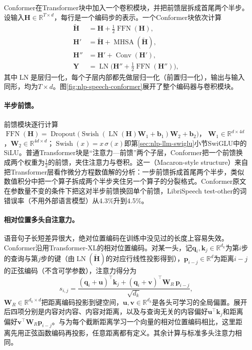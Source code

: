Conformer在Transformer块中加入一个卷积模块，并把前馈层拆成首尾两个半步。设输入$\bm H\in\mathbb R^{T\times d}$，每行是一个编码步的表示。一个Conformer块依次计算
\begin{equation}
 \begin{aligned}
  \tilde{\bm H}&=\bm H+\tfrac12\operatorname{FFN}(\bm H),\\
  \bm H'&=\tilde{\bm H}+\operatorname{MHSA}(\tilde{\bm H}),\\
  \bm H''&=\bm H'+\operatorname{Conv}(\bm H'),\\
  \bm Y&=\operatorname{LN}\bigl(\bm H''+\tfrac12\operatorname{FFN}(\bm H'')\bigr),
 \end{aligned}
 \label{eq:nlp-speech-conformer}
\end{equation}
其中$\operatorname{LN}$是层归一化，每个子层内部都先做层归一化（前置归一化），输出与输入同形，均为$T\times d$。图\ref{fig:nlp-speech-conformer}展开了整个编码器与卷积模块。

\paragraph{半步前馈。}前馈模块逐行计算
$\operatorname{FFN}(\bm H)=\operatorname{Dropout}\bigl(\operatorname{Swish}(\operatorname{LN}(\bm H)\bm W_1+\bm b_1)\bm W_2+\bm b_2\bigr)$，
$\bm W_1\in\mathbb R^{d\times4d}$，$\bm W_2\in\mathbb R^{4d\times d}$；$\operatorname{Swish}(x)=x\,\sigma(x)$即第\ref{sec:nlp-llm-swiglu}小节SwiGLU中的SiLU\cite{ramachandran2017swish}。普通Transformer块是“注意力—前馈”两个子层，Conformer把一个前馈换成两个权重为$\tfrac12$的前馈，夹住注意力与卷积。这一（Macaron-style structure）来自把Transformer层看作微分方程数值解的分析：一步前馈拆成首尾两个半步，类似数值积分中把一个算子拆成两个半步夹住另一个算子的分裂格式\cite{nlp-speech-lu2019macaron}。Conformer原文在参数量不变的条件下把这对半步前馈换回单个前馈，LibriSpeech test-other的词错误率（不用外部语言模型）从4.3\%升到4.5\%。

\paragraph{相对位置多头自注意力。}语音句子长短差异很大，绝对位置编码在训练中没见过的长度上容易失效。Conformer沿用Transformer-XL的相对位置编码\cite{nlp-speech-dai2019transformerxl}。对某一头，记$\bm q_i,\bm k_j\in\mathbb R^{d_k}$为第$i$步的查询与第$j$步的键（由$\operatorname{LN}(\tilde{\bm H})$的对应行线性投影得到），$\bm p_{i-j}\in\mathbb R^{d}$为距离$i-j$的正弦编码（不含可学参数），注意力得分为
\begin{equation}
 s_{i,j}=\frac{(\bm q_i+\bm u)^{\top}\bm k_j+(\bm q_i+\bm v)^{\top}\bm W_R\,\bm p_{i-j}}{\sqrt{d_k}},
 \label{eq:nlp-speech-relpos}
\end{equation}
$\bm W_R\in\mathbb R^{d_k\times d}$把距离编码投影到键空间，$\bm u,\bm v\in\mathbb R^{d_k}$是各头可学习的全局偏置。展开后四项分别是内容对内容、内容对距离，以及与查询无关的内容偏好$\bm u^{\top}\bm k_j$和距离偏好$\bm v^{\top}\bm W_R\bm p_{i-j}$。与为每个截断距离学习一个向量的相对位置编码相比，这里距离先用正弦函数编码再投影，任意距离都有定义。其余计算与标准多头注意力相同。

